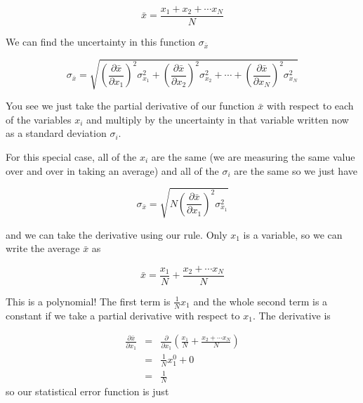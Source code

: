 \begin{equation*}
	\bar{x}=\frac{x_{1}+x_{2}+\cdots x_{N}}{N}
\end{equation*}

We can find the uncertainty in this function $\sigma _{\bar{x}}$

\begin{equation*}
	\sigma _{\bar{x}}=\sqrt{\left( \frac{\partial \bar{x}}{\partial x_{1}} \right) ^{2}\sigma _{x_{1}}^{2}+\left( \frac{\partial \bar{x}}{\partial x_{2}}\right) ^{2}\sigma _{x_{2}}^{2}+\cdots +\left( \frac{\partial \bar{x}}{\partial x_{N}}\right) ^{2}\sigma _{x_{N}}^{2}}
\end{equation*}

You see we just take the partial derivative of our function $\bar{x}$ with respect to each of the variables $x_{i}$ and multiply by the uncertainty in that variable written now as a standard deviation $\sigma _{i}.$

For this special case, all of the $x_{i}$ are the same (we are measuring the same value over and over in taking an average) and all of the $\sigma _{i}$ are the same so we just have

\begin{equation*}
	\sigma _{\bar{x}}=\sqrt{N\left( \frac{\partial \bar{x}}{\partial x_{1}} \right) ^{2}\sigma _{x_{1}}^{2}}
\end{equation*}

and we can take the derivative using our rule. Only $x_{1}$ is a variable, so we can write the average $\bar{x}$ as 

\begin{equation*}
	\bar{x}=\frac{x_{1}}{N}+\frac{x_{2}+\cdots x_{N}}{N}
\end{equation*}

This is a polynomial! The first term is $\frac{1}{N}x_{1}$ and the whole second term is a constant if we take a partial derivative with respect to $x_{1}$. The derivative is 

\begin{eqnarray*}
	\frac{\partial \bar{x}}{\partial x_{1}} &=&\frac{\partial }{\partial x_{1}}\left( \frac{x_{1}}{N}+\frac{x_{2}+\cdots x_{N}}{N}\right) \\
                                            &=&\frac{1}{N}x_{1}^{0}+0 \\
                                            &=&\frac{1}{N}
\end{eqnarray*}
so our statistical error function is just 

